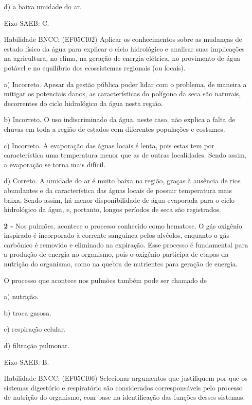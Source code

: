 d) a baixa umidade do ar.

Eixo SAEB: C.

Habilidade BNCC: (EF05CI02) Aplicar os conhecimentos sobre as mudanças
de estado físico da água para explicar o ciclo hidrológico e analisar
suas implicações na agricultura, no clima, na geração de energia
elétrica, no provimento de água potável e no equilíbrio dos ecossistemas
regionais (ou locais).

a) Incorreto. Apesar da gestão pública poder lidar com o problema, de
maneira a mitigar os potenciais danos, as características do polígono da
seca são naturais, decorrentes do ciclo hidrológico da água nesta
região.

b) Incorreto. O uso indiscriminado da água, neste caso, não explica a
falta de chuvas em toda a região de estados com diferentes populações e
costumes.

c) Incorreto. A evaporação das águas locais é lenta, pois estas tem por
característica uma temperatura menor que as de outras localidades. Sendo
assim, a evaporação se torna mais difícil.

d) Correto. A umidade do ar é muito baixa na região, graças à ausência
de rios abundantes e da característica das águas locais de possuir
temperatura mais baixa. Sendo assim, há menor disponibilidade de água
evaporada para o ciclo hidrológico da água, e, portanto, longos períodos
de seca são registrados.

\textbf{2 -} Nos pulmões, acontece o processo conhecido como hematose. O
gás oxigênio inspirado é incorporado à corrente sanguínea pelos
alvéolos, enquanto o gás carbônico é removido e eliminado na expiração.
Esse processo é fundamental para a produção de energia no organismo,
pois o oxigênio participa de etapas da nutrição do organismo, como na
quebra de nutrientes para geração de energia.

O processo que acontece nos pulmões também pode ser chamado de

a) nutrição.

b) troca gasosa.

c) respiração celular.

d) filtração pulmonar.

Eixo SAEB: B.

Habilidade BNCC: (EF05CI06) Selecionar argumentos que justifiquem por
que os sistemas digestório e respiratório são considerados
corresponsáveis pelo processo de nutrição do organismo, com base na
identificação das funções desses sistemas.

